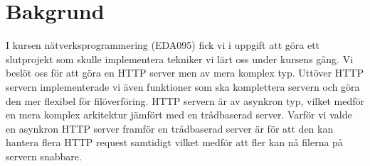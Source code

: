 \section{Bakgrund}
I kursen nätverksprogrammering (EDA095) fick vi i uppgift att göra ett slutprojekt som skulle implementera tekniker vi lärt oss under kursens gång. Vi beslöt oss för att göra en HTTP server men av mera komplex typ. Uttöver HTTP servern implementerade vi även funktioner som ska komplettera servern och göra den mer flexibel för filöverföring. 
HTTP servern är av asynkron typ, vilket medför en mera komplex arkitektur jämfört med en trådbaserad server. 
Varför vi valde en asynkron HTTP server framför en trådbaserad server är för att den kan hantera flera HTTP request samtidigt vilket medför att fler kan nå filerna på servern snabbare. 
